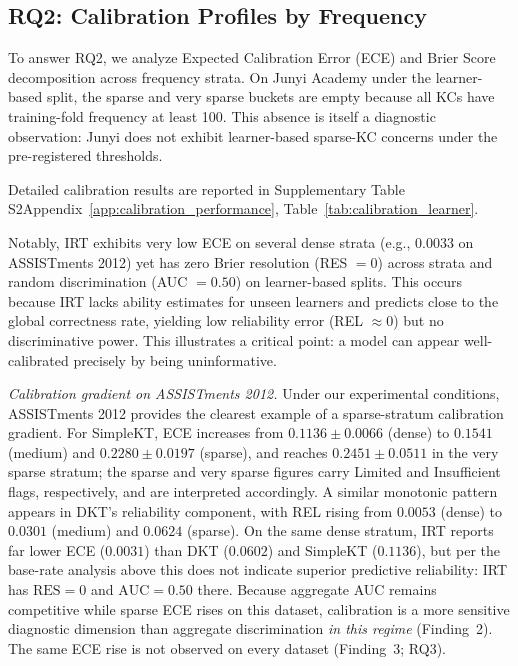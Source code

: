\subsection{RQ2: Calibration Profiles by Frequency}
To answer RQ2, we analyze Expected Calibration Error (ECE) and Brier Score decomposition across frequency strata. On Junyi Academy under the learner-based split, the sparse and very sparse buckets are empty because all KCs have training-fold frequency at least 100. This absence is itself a diagnostic observation: Junyi does not exhibit learner-based sparse-KC concerns under the pre-registered thresholds.

Detailed calibration results are reported in \ifdefined\iscompact Supplementary Table S2\else Appendix~\ref{app:calibration_performance}, Table~\ref{tab:calibration_learner}\fi.

Notably, IRT exhibits very low ECE on several dense strata (e.g., $0.0033$ on ASSISTments 2012) yet has zero Brier resolution (RES $= 0$) across strata and random discrimination (AUC $= 0.50$) on learner-based splits. This occurs because IRT lacks ability estimates for unseen learners and predicts close to the global correctness rate, yielding low reliability error (REL $\approx 0$) but no discriminative power. This illustrates a critical point: a model can appear well-calibrated precisely by being uninformative.

\textit{Calibration gradient on ASSISTments 2012.}
Under our experimental conditions, ASSISTments 2012 provides the clearest example of a sparse-stratum calibration gradient. For SimpleKT, ECE increases from $0.1136 \pm 0.0066$ (dense) to $0.1541$ (medium) and $0.2280 \pm 0.0197$ (sparse), and reaches $0.2451 \pm 0.0511$ in the very sparse stratum; the sparse and very sparse figures carry Limited and Insufficient flags, respectively, and are interpreted accordingly. A similar monotonic pattern appears in DKT's reliability component, with REL rising from $0.0053$ (dense) to $0.0301$ (medium) and $0.0624$ (sparse). On the same dense stratum, IRT reports far lower ECE ($0.0031$) than DKT ($0.0602$) and SimpleKT ($0.1136$), but per the base-rate analysis above this does not indicate superior predictive reliability: IRT has $\text{RES} = 0$ and $\text{AUC} = 0.50$ there. Because aggregate AUC remains competitive while sparse ECE rises on this dataset, calibration is a more sensitive diagnostic dimension than aggregate discrimination \emph{in this regime} (Finding~2). The same ECE rise is not observed on every dataset (Finding~3; RQ3).

